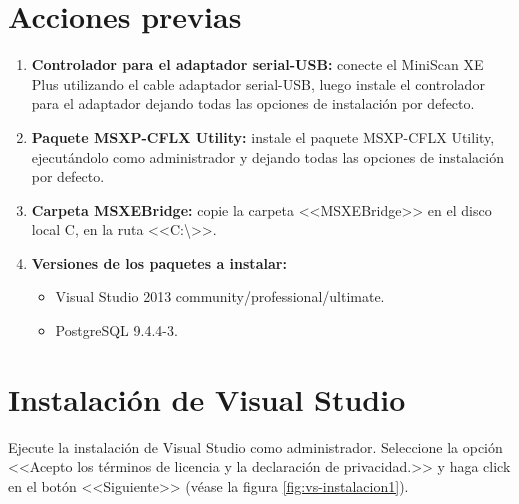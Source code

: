 \newpage

\section*{Acciones previas}

\begin{enumerate}
	\item \textbf{Controlador para el adaptador serial-USB:} conecte el MiniScan XE Plus utilizando el cable adaptador serial-USB, luego instale el controlador para el adaptador dejando todas las opciones de instalaci\'{o}n por defecto.
	
	\item \textbf{Paquete MSXP-CFLX Utility:} instale el paquete MSXP-CFLX Utility, ejecut\'{a}ndolo como administrador y dejando todas las opciones de instalaci\'{o}n por defecto.
	
	\item \textbf{Carpeta MSXEBridge:} copie la carpeta <<MSXEBridge>> en el disco local C, en la ruta <<C:\textbackslash>>.
	
	\item \textbf{Versiones de los paquetes a instalar:} 
	\begin{itemize}
		\item Visual Studio 2013 community/professional/ultimate.
	
		\item PostgreSQL 9.4.4-3.
	\end{itemize}
\end{enumerate}

\newpage

\section*{Instalaci\'{o}n de Visual Studio}
	
Ejecute la instalaci\'{o}n de Visual Studio como administrador. Seleccione la opci\'{o}n <<Acepto los t\'{e}rminos de licencia y la declaraci\'{o}n de privacidad.>> y haga click en el bot\'{o}n <<Siguiente>> (v\'{e}ase la figura \ref{fig:vs-instalacion1}).

